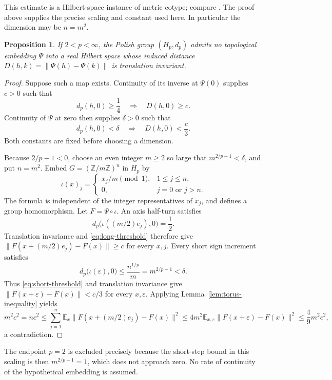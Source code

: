 \documentclass[11pt]{article}
\numberwithin{equation}{section}
\newtheorem{proposition}[theorem]{Proposition}
\theoremstyle{definition}
\newcommand{\Z}{\mathbb Z}
\newcommand{\E}{\mathbb E}
\begin{document}
This estimate is a Hilbert-space instance of metric cotype; compare
\cite[Proposition 3.1]{MN}. The proof above supplies the precise scaling
and constant used here. In particular the dimension may be $n=m^2$.

\begin{proposition}\label{prop:lp-obstruction}
If $2<p<\infty$, the Polish group $(H_p,d_p)$ admits no topological embedding
$\Psi$ into a real Hilbert space whose induced distance
$D(h,k)=\|\Psi(h)-\Psi(k)\|$ is translation invariant.
\end{proposition}
\begin{proof}
Suppose such a map exists. Continuity of its inverse at $\Psi(0)$
supplies $c>0$ such that
\begin{equation}\label{eq:long-threshold}
 d_p(h,0)\ge\frac14\quad\Longrightarrow\quad D(h,0)\ge c.
\end{equation}
Continuity of $\Psi$ at zero then supplies $\delta>0$ such that
\begin{equation}\label{eq:short-threshold}
 d_p(h,0)<\delta\quad\Longrightarrow\quad D(h,0)<\frac c3.
\end{equation}
Both constants are fixed before choosing a dimension.

Because $2/p-1<0$, choose an even integer $m\ge2$ so large that
$m^{2/p-1}<\delta$, and put $n=m^2$. Embed $G=(\Z/m\Z)^n$ in $H_p$
by
\[
 \iota(x)_j=\begin{cases}x_j/m\pmod1,&1\le j\le n,\\0,&j=0\text{ or }j>n.
 \end{cases}
\]
The formula is independent of the integer representatives of $x_j$,
and defines a group homomorphism. Let $F=\Psi\circ\iota$.
An axis half-turn satisfies
\[
 d_p\bigl(\iota((m/2)e_j),0\bigr)=\frac12.
\]
Translation invariance and \eqref{eq:long-threshold} therefore give
$\|F(x+(m/2)e_j)-F(x)\|\ge c$ for every $x,j$. Every short sign
increment satisfies
\[
 d_p\bigl(\iota(\varepsilon),0\bigr)
 \le\frac{n^{1/p}}m=m^{2/p-1}<\delta.
\]
Thus \eqref{eq:short-threshold} and translation invariance give
$\|F(x+\varepsilon)-F(x)\|<c/3$ for every $x,\varepsilon$.
Applying Lemma~\ref{lem:torus-inequality} yields
\[
 m^2c^2=nc^2
 \le\sum_{j=1}^n\E_x\|F(x+(m/2)e_j)-F(x)\|^2
 \le4m^2\E_{x,\varepsilon}\|F(x+\varepsilon)-F(x)\|^2
 \le\frac49m^2c^2,
\]
a contradiction.
\end{proof}

The endpoint $p=2$ is excluded precisely because the short-step bound
in this scaling is then $m^{2/p-1}=1$, which does not approach zero.
No rate of continuity of the hypothetical embedding is assumed.
\end{document}
